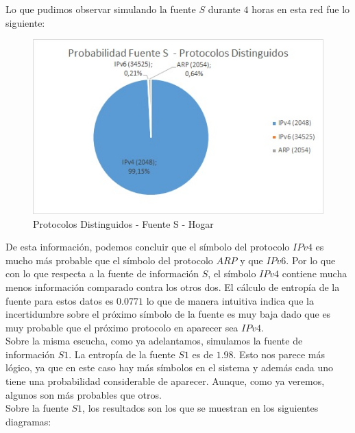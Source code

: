 Lo que pudimos observar simulando la fuente $S$ durante $4$ horas en esta red fue lo siguiente:\\
%

\begin{figure}[h!]
\centering
\includegraphics[scale=0.9]{./img/probaS_casa.jpg}
\caption{Protocolos Distinguidos - Fuente S - Hogar}
\end{figure}

De esta información, podemos concluir que el símbolo del protocolo $IPv4$ es mucho más probable que el símbolo del protocolo $ARP$ y que $IPv6$. 
Por lo que con lo que respecta a la fuente de información $S$, el símbolo $IPv4$ contiene mucha menos información comparado contra los otros dos. 
El cálculo de entropía de la fuente para estos datos es $0.0771$ lo que de manera intuitiva indica que la incertidumbre sobre el próximo símbolo 
de la fuente es muy baja dado que es muy probable que el próximo protocolo en aparecer sea $IPv4$.\\

Sobre la misma escucha, como ya adelantamos, simulamos la fuente de información $S1$. 
La entropía de la fuente $S1$ es de $1.98$. Esto nos parece más lógico, ya que en este caso hay más símbolos en el sistema y 
además cada uno tiene una probabilidad considerable de aparecer. Aunque, como ya veremos, algunos son más probables que otros.\\

Sobre la fuente $S1$, los resultados son los que se muestran en los siguientes diagramas:

